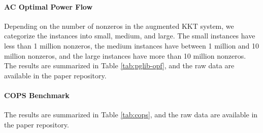 \documentclass{article}
\begin{document}
\paragraph{AC Optimal Power Flow}
Depending on the number of nonzeros in the augmented KKT system, we categorize the instances into small, medium, and large. The small instances have less than 1 million nonzeros, the medium instances have between 1 million and 10 million nonzeros, and the large instances have more than 10 million nonzeros. The results are summarized in Table \ref{tab:pglib-opf}, and the raw data are available in the paper repository.
\begin{center}
  \footnotesize
  
\end{center}



\paragraph{COPS Benchmark}
The results are summarized in Table \ref{tab:cops}, and the raw data are available in the paper repository.
\begin{center}
  \footnotesize
  
\end{center}  


\end{document}
